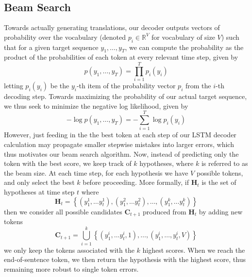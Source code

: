 \documentclass[11pt]{article}
\begin{document}
\subsection{Beam Search}
Towards actually generating translations, our decoder outputs vectors of probability over the vocabulary (denoted $p_i \in \mathbb{R}^V$ for vocabulary of size $V$) such that for a given target sequence $y_1, \ldots, y_T$, we can compute the probability as the product of the probabilities of each token at every relevant time step, given by
\[
p(y_1, \ldots, y_T) = \prod_{i=1}^Tp_i(y_i)
\]
letting $p_i(y_i)$ be the $y_i$-th item of the probability vector $p_i$ from the $i$-th decoding step. Towards maximizing the probability of our actual target sequence, we thus seek to minimize the negative log likelihood, given by
\[
-\log p(y_1, \ldots, y_T) = -\sum_{i=1}^T \log p_i(y_i)
\]
However, just feeding in the the best token at each step of our LSTM decoder calculation may propagate smaller stepwise mistakes into larger errors, which thus motivates our beam search algorithm. Now, instead of predicting only the token with the best score, we keep track of $k$ hypotheses, where $k$ is referred to as the beam size. At each time step, for each hypothesis we have $V$ possible tokens, and only select the best $k$ before proceeding. More formally, if $\mathbf{H}_t$ is the set of hypotheses at time step $t$ where
\[
\mathbf{H}_t = \left\{(y_1^1, \ldots y_t^1), (y_1^2, \ldots y_t^2), \ldots, (y_1^k, \ldots y_t^k) \right\}
\]
then we consider all possible candidates $\mathbf{C}_{t+1}$ produced from $\mathbf{H}_t$ by adding new tokens
\[
\mathbf{C}_{t+1} = \bigcup_{i=1}^k \left\{(y_1^i, \ldots y_t^i, 1), \ldots, (y_1^i, \ldots, y_t^i, V )\right\}
\]
we only keep the tokens associated with the $k$ highest scores. When we reach the end-of-sentence token, we then return the hypothesis with the highest score, thus remaining more robust to single token errors.



\end{document}
